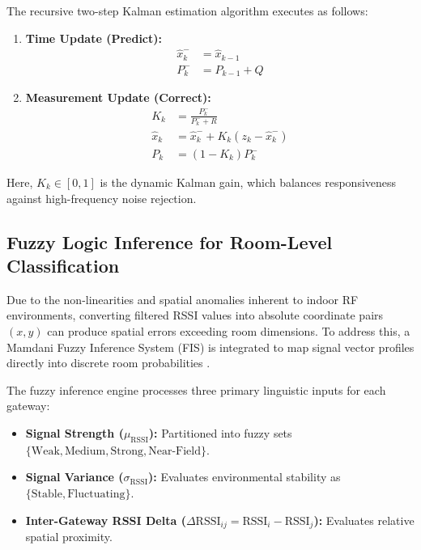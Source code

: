 The recursive two-step Kalman estimation algorithm executes as follows:
\begin{enumerate}
    \item \textbf{Time Update (Predict):}
    \begin{align}
    \hat{x}_k^- &= \hat{x}_{k-1} \label{eq:kf_pred_state} \\
    P_k^- &= P_{k-1} + Q \label{eq:kf_pred_cov}
    \end{align}
    \item \textbf{Measurement Update (Correct):}
    \begin{align}
    K_k &= \frac{P_k^-}{P_k^- + R} \label{eq:kf_gain} \\
    \hat{x}_k &= \hat{x}_k^- + K_k \left(z_k - \hat{x}_k^-\right) \label{eq:kf_update_state} \\
    P_k &= (1 - K_k) P_k^- \label{eq:kf_update_cov}
    \end{align}
\end{enumerate}
Here, $K_k \in [0, 1]$ is the dynamic Kalman gain, which balances responsiveness against high-frequency noise rejection.

\subsection{Fuzzy Logic Inference for Room-Level Classification}
Due to the non-linearities and spatial anomalies inherent to indoor RF environments, converting filtered RSSI values into absolute coordinate pairs $(x, y)$ can produce spatial errors exceeding room dimensions. To address this, a Mamdani Fuzzy Inference System (FIS) is integrated to map signal vector profiles directly into discrete room probabilities \cite{fuzzy_rssi_localization}.

The fuzzy inference engine processes three primary linguistic inputs for each gateway:
\begin{itemize}
    \item \textbf{Signal Strength ($\mu_{\text{RSSI}}$):} Partitioned into fuzzy sets $\{\text{Weak}, \text{Medium}, \text{Strong}, \text{Near-Field}\}$.
    \item \textbf{Signal Variance ($\sigma_{\text{RSSI}}$):} Evaluates environmental stability as $\{\text{Stable}, \text{Fluctuating}\}$.
    \item \textbf{Inter-Gateway RSSI Delta ($\Delta \text{RSSI}_{ij} = \text{RSSI}_i - \text{RSSI}_j$):} Evaluates relative spatial proximity.
\end{itemize}

